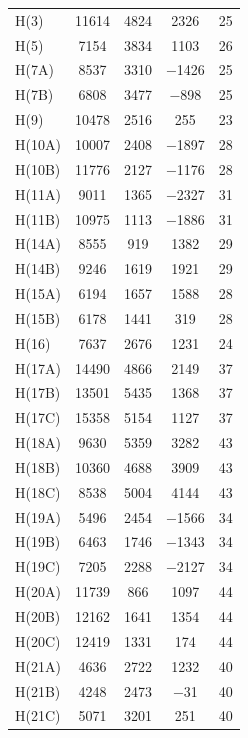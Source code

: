 \begin{center}
\tablelasttail{\bottomrule}
 {\footnotesize \singlespacing
\begin{supertabular}{lcccc}
H(3)&11614&4824&2326&25\\
H(5)&7154&3834&1103&26\\
H(7A)&8537&3310&$-$1426&25\\
H(7B)&6808&3477&$-$898&25\\
H(9)&10478&2516&255&23\\
H(10A)&10007&2408&$-$1897&28\\
H(10B)&11776&2127&$-$1176&28\\
H(11A)&9011&1365&$-$2327&31\\
H(11B)&10975&1113&$-$1886&31\\
H(14A)&8555&919&1382&29\\
H(14B)&9246&1619&1921&29\\
H(15A)&6194&1657&1588&28\\
H(15B)&6178&1441&319&28\\
H(16)&7637&2676&1231&24\\
H(17A)&14490&4866&2149&37\\
H(17B)&13501&5435&1368&37\\
H(17C)&15358&5154&1127&37\\
H(18A)&9630&5359&3282&43\\
H(18B)&10360&4688&3909&43\\
H(18C)&8538&5004&4144&43\\
H(19A)&5496&2454&$-$1566&34\\
H(19B)&6463&1746&$-$1343&34\\
H(19C)&7205&2288&$-$2127&34\\
H(20A)&11739&866&1097&44\\
H(20B)&12162&1641&1354&44\\
H(20C)&12419&1331&174&44\\
H(21A)&4636&2722&1232&40\\
H(21B)&4248&2473&$-$31&40\\
H(21C)&5071&3201&251&40\\
\end{supertabular}
}
\end{center}

